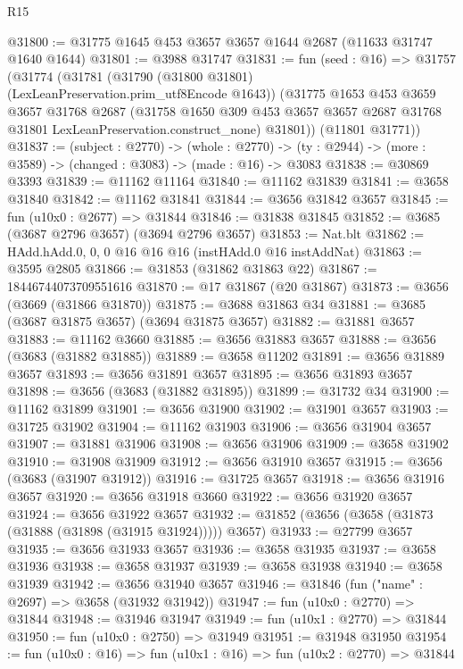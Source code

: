 \begin{lexlean}{R15}
\begin{coremodule}
@31800 := @31775 @1645 @453 @3657 @3657 @1644 @2687 (@11633 @31747 @1640 @1644)
@31801 := @3988 @31747
@31831 := fun (seed : @16) =>
  @31757
    (@31774
      (@31781
        (@31790 (@31800 @31801) (LexLeanPreservation.prim_utf8Encode @1643))
        (@31775
          @1653
          @453
          @3659
          @3657
          @31768
          @2687
          (@31758
            @1650
            @309
            @453
            @3657
            @3657
            @2687
            @31768
            @31801
            LexLeanPreservation.construct_none)
          @31801))
      (@11801 @31771))
@31837 := (subject : @2770) ->
  (whole : @2770) -> (ty : @2944) -> (more : @3589) -> (changed : @3083) -> (made : @16) -> @3083
@31838 := @30869 @3393
@31839 := @11162 @11164
@31840 := @11162 @31839
@31841 := @3658 @31840
@31842 := @11162 @31841
@31844 := @3656 @31842 @3657
@31845 := fun (u10x0 : @2677) => @31844
@31846 := @31838 @31845
@31852 := @3685 (@3687 @2796 @3657) (@3694 @2796 @3657)
@31853 := Nat.blt
@31862 := HAdd.hAdd.{0, 0, 0} @16 @16 @16 (instHAdd.{0} @16 instAddNat)
@31863 := @3595 @2805
@31866 := @31853 (@31862 @31863 @22)
@31867 := 18446744073709551616
@31870 := @17 @31867 (@20 @31867)
@31873 := @3656 (@3669 (@31866 @31870))
@31875 := @3688 @31863 @34
@31881 := @3685 (@3687 @31875 @3657) (@3694 @31875 @3657)
@31882 := @31881 @3657
@31883 := @11162 @3660
@31885 := @3656 @31883 @3657
@31888 := @3656 (@3683 (@31882 @31885))
@31889 := @3658 @11202
@31891 := @3656 @31889 @3657
@31893 := @3656 @31891 @3657
@31895 := @3656 @31893 @3657
@31898 := @3656 (@3683 (@31882 @31895))
@31899 := @31732 @34
@31900 := @11162 @31899
@31901 := @3656 @31900
@31902 := @31901 @3657
@31903 := @31725 @31902
@31904 := @11162 @31903
@31906 := @3656 @31904 @3657
@31907 := @31881 @31906
@31908 := @3656 @31906
@31909 := @3658 @31902
@31910 := @31908 @31909
@31912 := @3656 @31910 @3657
@31915 := @3656 (@3683 (@31907 @31912))
@31916 := @31725 @3657
@31918 := @3656 @31916 @3657
@31920 := @3656 @31918 @3660
@31922 := @3656 @31920 @3657
@31924 := @3656 @31922 @3657
@31932 := @31852 (@3656 (@3658 (@31873 (@31888 (@31898 (@31915 @31924))))) @3657)
@31933 := @27799 @3657
@31935 := @3656 @31933 @3657
@31936 := @3658 @31935
@31937 := @3658 @31936
@31938 := @3658 @31937
@31939 := @3658 @31938
@31940 := @3658 @31939
@31942 := @3656 @31940 @3657
@31946 := @31846 (fun ("name" : @2697) => @3658 (@31932 @31942))
@31947 := fun (u10x0 : @2770) => @31844
@31948 := @31946 @31947
@31949 := fun (u10x1 : @2770) => @31844
@31950 := fun (u10x0 : @2750) => @31949
@31951 := @31948 @31950
@31954 := fun (u10x0 : @16) => fun (u10x1 : @16) => fun (u10x2 : @2770) => @31844

\end{coremodule}
\end{lexlean}
